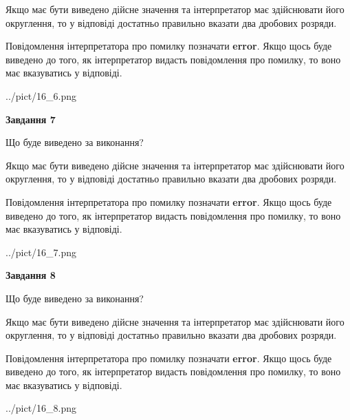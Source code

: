 \documentclass[12pt, ukrainian]{article}
\begin{document}
{\begin {Large}
Якщо має бути виведено дійсне значення та інтерпретатор має здійснювати його округлення, 
то у відповіді достатньо правильно вказати два дробових розряди.

Повідомлення інтерпретатора про помилку позначати \textbf{error}.
Якщо щось буде виведено до того, як інтерпретатор видасть повідомлення про помилку, 
то воно має вказуватись у відповіді. \par

\begin{center}
	{../pict/16_6.png}
\end{center}
\newpage

{\begin {center}\textbf{Завдання 7}\end {center}}\par
Що буде виведено за виконання? \par

Якщо має бути виведено дійсне значення та інтерпретатор має здійснювати його округлення, 
то у відповіді достатньо правильно вказати два дробових розряди.

Повідомлення інтерпретатора про помилку позначати \textbf{error}.
Якщо щось буде виведено до того, як інтерпретатор видасть повідомлення про помилку, 
то воно має вказуватись у відповіді. \par

\begin{center}
	{../pict/16_7.png}
\end{center}
\newpage

{\begin {center}\textbf{Завдання 8}\end {center}}\par
Що буде виведено за виконання? \par

Якщо має бути виведено дійсне значення та інтерпретатор має здійснювати його округлення, 
то у відповіді достатньо правильно вказати два дробових розряди.

Повідомлення інтерпретатора про помилку позначати \textbf{error}.
Якщо щось буде виведено до того, як інтерпретатор видасть повідомлення про помилку, 
то воно має вказуватись у відповіді. \par

\begin{center}
	{../pict/16_8.png}
\end{center}
\newpage


\end{Large}}
\end{document}
